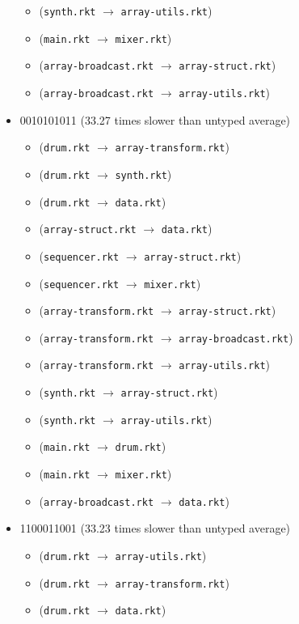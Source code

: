 \documentclass{article}
\newcommand{\mono}[1]{\texttt{#1}}
\begin{document}
\begin{itemize}
\begin{itemize}
  \item (\mono{synth.rkt} $\rightarrow$ \mono{array-utils.rkt})
  \item (\mono{main.rkt} $\rightarrow$ \mono{mixer.rkt})
  \item (\mono{array-broadcast.rkt} $\rightarrow$ \mono{array-struct.rkt})
  \item (\mono{array-broadcast.rkt} $\rightarrow$ \mono{array-utils.rkt})
  \end{itemize}
\item 0010101011 (33.27 times slower than untyped average)
  \begin{itemize}
  \item (\mono{drum.rkt} $\rightarrow$ \mono{array-transform.rkt})
  \item (\mono{drum.rkt} $\rightarrow$ \mono{synth.rkt})
  \item (\mono{drum.rkt} $\rightarrow$ \mono{data.rkt})
  \item (\mono{array-struct.rkt} $\rightarrow$ \mono{data.rkt})
  \item (\mono{sequencer.rkt} $\rightarrow$ \mono{array-struct.rkt})
  \item (\mono{sequencer.rkt} $\rightarrow$ \mono{mixer.rkt})
  \item (\mono{array-transform.rkt} $\rightarrow$ \mono{array-struct.rkt})
  \item (\mono{array-transform.rkt} $\rightarrow$ \mono{array-broadcast.rkt})
  \item (\mono{array-transform.rkt} $\rightarrow$ \mono{array-utils.rkt})
  \item (\mono{synth.rkt} $\rightarrow$ \mono{array-struct.rkt})
  \item (\mono{synth.rkt} $\rightarrow$ \mono{array-utils.rkt})
  \item (\mono{main.rkt} $\rightarrow$ \mono{drum.rkt})
  \item (\mono{main.rkt} $\rightarrow$ \mono{mixer.rkt})
  \item (\mono{array-broadcast.rkt} $\rightarrow$ \mono{data.rkt})
  \end{itemize}
\item 1100011001 (33.23 times slower than untyped average)
  \begin{itemize}
  \item (\mono{drum.rkt} $\rightarrow$ \mono{array-utils.rkt})
  \item (\mono{drum.rkt} $\rightarrow$ \mono{array-transform.rkt})
  \item (\mono{drum.rkt} $\rightarrow$ \mono{data.rkt})

\end{itemize}
\end{itemize}
\end{document}
